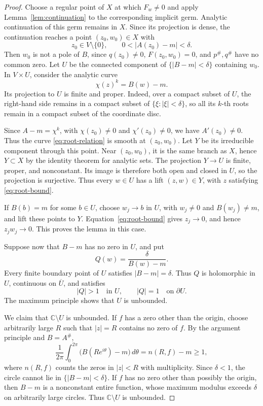 \documentclass[11pt]{article}
\theoremstyle{remark}
\numberwithin{equation}{section}
\newcommand{\C}{\mathbb C}
\begin{document}
\begin{proof}
Choose a regular point of \(X\) at which \(F_w\ne0\) and apply
Lemma~\ref{lem:continuation} to the corresponding implicit germ.
Analytic continuation of this germ remains in \(X\).
Since its projection is dense, the continuation reaches a point
\((z_0,w_0)\in X\) with
\[
 z_0\in V\setminus\{0\},\qquad
 0<|A(z_0)-m|<\delta.
\]
Then \(w_0\) is not a pole of \(B\), since \(q(z_0)\ne0\),
\(F(z_0,w_0)=0\), and \(p^\#,q^\#\) have no common zero.
Let \(U\) be the connected component of \(\{|B-m|<\delta\}\)
containing \(w_0\).
In \(V\times U\), consider the analytic curve
\begin{equation}\label{eq:root-relation}
 \chi(z)^k=B(w)-m.
\end{equation}
Its projection to \(U\) is finite and proper. Indeed, over a compact
subset of \(U\), the right-hand side remains in a compact subset of
\(\{\xi:|\xi|<\delta\}\), so all its \(k\)-th roots remain in a
compact subset of the coordinate disc.

Since \(A-m=\chi^k\), with \(\chi(z_0)\ne0\) and
\(\chi'(z_0)\ne0\), we have \(A'(z_0)\ne0\). Thus the curve
\eqref{eq:root-relation} is smooth at \((z_0,w_0)\). Let \(Y\) be its
irreducible component through this point. Near \((z_0,w_0)\), it is the same branch as \(X\), hence
\(Y\subset X\) by the identity theorem for analytic sets. The
projection \(Y\to U\) is finite, proper, and nonconstant. Its image is
therefore both open and closed in \(U\), so the projection is
surjective. Thus every \(w\in U\) has a lift \((z,w)\in Y\), with
\(z\) satisfying \eqref{eq:root-bound}.

If \(B(b)=m\) for some \(b\in U\), choose \(w_j\to b\) in \(U\),
with \(w_j\ne0\) and \(B(w_j)\ne m\), and lift these points to \(Y\).
Equation~\eqref{eq:root-bound} gives \(z_j\to0\), and hence
\(z_jw_j\to0\). This proves the lemma in this case.

Suppose now that \(B-m\) has no zero in \(U\), and put
\begin{equation}\label{eq:Q}
 Q(w)=\frac{\delta}{B(w)-m}.
\end{equation}
Every finite boundary point of \(U\) satisfies \(|B-m|=\delta\).
Thus \(Q\) is holomorphic in \(U\), continuous on \(\overline U\),
and satisfies
\[
 |Q|>1\quad\text{in }U,
 \qquad |Q|=1\quad\text{on }\partial U.
\]
The maximum principle shows that \(U\) is unbounded.

We claim that \(\C\setminus U\) is unbounded. If \(f\) has a zero
other than the origin, choose arbitrarily large \(R\) such that
\(|z|=R\) contains no zero of \(f\). By the argument principle and
\(B=A^\#\),
\[
 \frac1{2\pi}\int_0^{2\pi}\bigl(B(Re^{i\theta})-m\bigr)\,d\theta
 =n(R,f)-m\ge1,
\]
where \(n(R,f)\) counts the zeros in \(|z|<R\) with multiplicity.
Since \(\delta<1\), the circle cannot lie in \(\{|B-m|<\delta\}\).
If \(f\) has no zero other than possibly the origin, then \(B-m\)
is a nonconstant entire function, whose maximum modulus exceeds
\(\delta\) on arbitrarily large circles. Thus \(\C\setminus U\)
is unbounded.


\end{proof}
\end{document}
